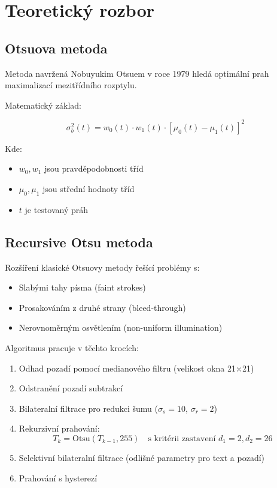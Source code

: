 \documentclass[12pt,a4paper]{article}
\begin{document}
\section{Teoretický rozbor}

\subsection{Otsuova metoda}
Metoda navržená Nobuyukim Otsuem v roce 1979 hledá optimální prah maximalizací mezitřídního rozptylu.

Matematický základ:

\begin{equation}
\sigma_b^2(t) = w_0(t) \cdot w_1(t) \cdot [\mu_0(t) - \mu_1(t)]^2
\end{equation}

Kde:
\begin{itemize}
\item $w_0, w_1$ jsou pravděpodobnosti tříd
\item $\mu_0, \mu_1$ jsou střední hodnoty tříd
\item $t$ je testovaný práh
\end{itemize}

\subsection{Recursive Otsu metoda}
Rozšíření klasické Otsuovy metody \cite{nina2010recursive} řešící problémy s:

\begin{itemize}
\item Slabými tahy písma (faint strokes)
\item Prosakováním z druhé strany (bleed-through)
\item Nerovnoměrným osvětlením (non-uniform illumination)
\end{itemize}

Algoritmus pracuje v těchto krocích:

\begin{enumerate}
\item Odhad pozadí pomocí medianového filtru (velikost okna 21×21)
\item Odstranění pozadí subtrakcí
\item Bilateralní filtrace pro redukci šumu ($\sigma_s=10$, $\sigma_r=2$)
\item Rekurzivní prahování:
\begin{equation}
T_k = \text{Otsu}(T_{k-1}, 255) \quad \text{s kritérii zastavení } d_1=2, d_2=26
\end{equation}
\item Selektivní bilateralní filtrace (odlišné parametry pro text a pozadí)
\item Prahování s hysterezí
\end{enumerate}
\end{document}
